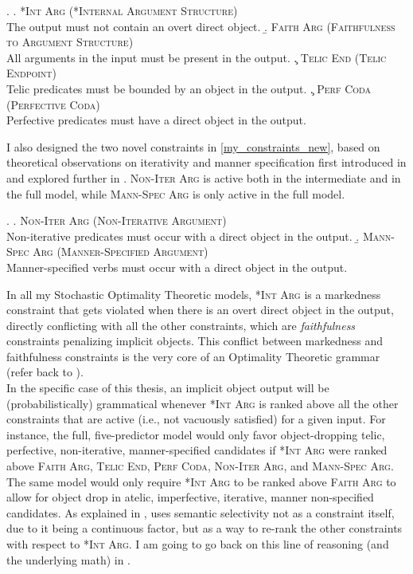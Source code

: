 \ex. \label{my_constraints_medina} 
\a. \label{my_constraints_intarg} \textsc{*Int Arg (*Internal Argument Structure)}\\ The output must not contain an overt direct object.
\b. \label{my_constraints_faith} \textsc{Faith Arg (Faithfulness to Argument Structure)}\\ All arguments in the input must be present in the output.
\c. \label{my_constraints_telic} \textsc{Telic End (Telic Endpoint)}\\ Telic predicates must be bounded by an object in the output.
\c. \label{my_constraints_perf} \textsc{Perf Coda (Perfective Coda)}\\ Perfective predicates must have a direct object in the output.

I also designed the two novel constraints in \ref{my_constraints_new}, based on theoretical observations on iterativity and manner specification first introduced in  and explored further in . \textsc{Non-Iter Arg} is active both in the intermediate and in the full model, while \textsc{Mann-Spec Arg} is only active in the full model.

\ex. \label{my_constraints_new} 
\a. \label{my_constraints_iter} \textsc{Non-Iter Arg (Non-Iterative Argument)}\\ Non-iterative predicates must occur with a direct object in the output.
\b. \label{my_constraints_spec} \textsc{Mann-Spec Arg (Manner-Specified Argument)}\\ Manner-specified verbs must occur with a direct object in the output.

In all my Stochastic Optimality Theoretic models, \textsc{*Int Arg} is a markedness constraint that gets violated when there is an overt direct object in the output, directly conflicting with all the other constraints, which are \textit{faithfulness} constraints penalizing implicit objects. This conflict between markedness and faithfulness constraints is the very core of an Optimality Theoretic grammar (refer back to ).\\
In the specific case of this thesis, an implicit object output will be (probabilistically) grammatical whenever \textsc{*Int Arg} is ranked above all the other constraints that are active (i.e., not vacuously satisfied) for a given input. For instance, the full, five-predictor model would only favor object-dropping telic, perfective, non-iterative, manner-specified candidates if \textsc{*Int Arg} were ranked above \textsc{Faith Arg}, \textsc{Telic End}, \textsc{Perf Coda}, \textsc{Non-Iter Arg}, and \textsc{Mann-Spec Arg}. The same model would only require \textsc{*Int Arg} to be ranked above \textsc{Faith Arg} to allow for object drop in atelic, imperfective, iterative, manner non-specified candidates. As explained in , \textcite{Medina2007} uses semantic selectivity not as a constraint itself, due to it being a continuous factor, but as a way to re-rank the other constraints with respect to \textsc{*Int Arg}. I am going to go back on this line of reasoning (and the underlying math) in .

